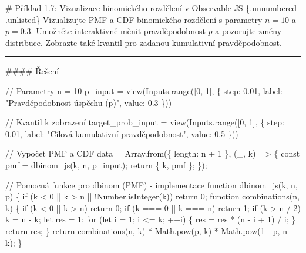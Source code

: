 \documentclass[
  czech,
  11pt,
  letterpaper,
  DIV=11,
  numbers=noendperiod]{scrreprt}
\newenvironment{Shaded}{\begin{snugshade}}{\end{snugshade}}
\newcommand{\NormalTok}[1]{\textcolor[rgb]{0.00,0.23,0.31}{#1}}
\begin{document}
\begin{tcolorbox}[enhanced jigsaw, arc=.35mm, bottomrule=.15mm, bottomtitle=1mm, breakable, colback=white, colbacktitle=quarto-callout-note-color!10!white, colframe=quarto-callout-note-color-frame, coltitle=black, left=2mm, leftrule=.75mm, opacityback=0, opacitybacktitle=0.6, rightrule=.15mm, title=\textcolor{quarto-callout-note-color}{\faInfo}\hspace{0.5em}{Poznámka}, titlerule=0mm, toprule=.15mm, toptitle=1mm]

\# Příklad 1.7: Vizualizace binomického rozdělení v Observable JS
\{.unnumbered .unlisted\} Vizualizujte PMF a CDF binomického rozdělení s
parametry \(n=10\) a \(p=0.3\). Umožněte interaktivně měnit
pravděpodobnost \(p\) a pozorujte změny distribuce. Zobrazte také
kvantil pro zadanou kumulativní pravděpodobnost.

\begin{center}\rule{0.5\linewidth}{0.5pt}\end{center}

\#\#\#\# Řešení

\begin{Shaded}
\begin{Highlighting}[]
\NormalTok{// Parametry}
\NormalTok{n = 10}
\NormalTok{p\_input = view(Inputs.range([0, 1], \{ step: 0.01, label: "Pravděpodobnost úspěchu (p)", value: 0.3 \}))}

\NormalTok{// Kvantil k zobrazení}
\NormalTok{target\_prob\_input = view(Inputs.range([0, 1], \{ step: 0.01, label: "Cílová kumulativní pravděpodobnost", value: 0.5 \}))}

\NormalTok{// Vypočet PMF a CDF}
\NormalTok{data = Array.from(\{ length: n + 1 \}, (\_, k) =\textgreater{} \{}
\NormalTok{  const pmf = dbinom\_js(k, n, p\_input);}
\NormalTok{  return \{ k, pmf \};}
\NormalTok{\});}

\NormalTok{// Pomocná funkce pro dbinom (PMF) {-} implementace}
\NormalTok{function dbinom\_js(k, n, p) \{}
\NormalTok{  if (k \textless{} 0 || k \textgreater{} n || !Number.isInteger(k)) return 0;}
\NormalTok{  function combinations(n, k) \{}
\NormalTok{    if (k \textless{} 0 || k \textgreater{} n) return 0;}
\NormalTok{    if (k === 0 || k === n) return 1;}
\NormalTok{    if (k \textgreater{} n / 2) k = n {-} k;}
\NormalTok{    let res = 1;}
\NormalTok{    for (let i = 1; i \textless{}= k; ++i) \{}
\NormalTok{      res = res * (n {-} i + 1) / i;}
\NormalTok{    \}}
\NormalTok{    return res;}
\NormalTok{  \}}
\NormalTok{  return combinations(n, k) * Math.pow(p, k) * Math.pow(1 {-} p, n {-} k);}
\NormalTok{\}}


\end{Highlighting}
\end{Shaded}
\end{tcolorbox}
\end{document}
